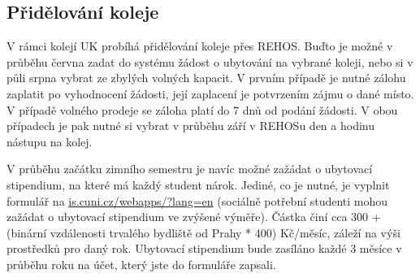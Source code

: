 \subsection{Přidělování koleje}
V rámci kolejí UK probíhá přidělování koleje přes REHOS. Buďto je možné v
průběhu června zadat do systému žádost o ubytování na vybrané koleji, nebo si v
půli srpna vybrat ze zbylých volných kapacit. V prvním případě je nutné zálohu
zaplatit po vyhodnocení žádosti, její zaplacení je potvrzením zájmu o dané
místo. V případě volného prodeje se záloha platí do 7 dnů od podání žádosti. V
obou případech je pak nutné si vybrat v průběhu září v REHOSu den a hodinu
nástupu na kolej.

V průběhu začátku zimního semestru je navíc možné zažádat o ubytovací
stipendium, na které má každý student nárok. Jediné, co je nutné, je vyplnit
formulář na \url{is.cuni.cz/webapps/?lang=en} (sociálně potřební studenti mohou
zažádat o ubytovací stipendium ve zvýšené výměře). Částka činí cca 300 +
(binární vzdálenosti trvalého bydliště od Prahy * 400) Kč/měsíc, záleží na výši
prostředků pro daný rok. Ubytovací stipendium bude zasíláno každé 3 měsíce v
průběhu roku na účet, který jste do formuláře zapsali.
